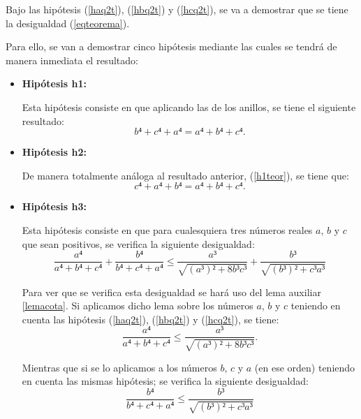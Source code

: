 \begin{demostracion}
  Bajo las hipótesis (\ref{haq2t}), (\ref{hbq2t}) y (\ref{hcq2t}), se va a
  demostrar que se tiene la desigualdad (\ref{eqteorema}).

  Para ello, se van a demostrar cinco hipótesis mediante las cuales se
  tendrá de manera inmediata el resultado:
  \begin{itemize}
  \item \textbf{Hipótesis h1:}

    Esta hipótesis consiste en que aplicando las de los anillos, se
    tiene el siguiente resultado:
    \begin{equation}\label{h1teor}\tag{h1}
      b⁴+c⁴+a⁴ = a⁴+b⁴+c⁴.
    \end{equation}

  \item \textbf{Hipótesis h2:}

    De manera totalmente análoga al resultado anterior, (\ref{h1teor}), se
    tiene que:
    \begin{equation}\label{h2teor}\tag{h2}
      c⁴+a⁴+b⁴ = a⁴+b⁴+c⁴.
    \end{equation}

  \item \textbf{Hipótesis h3:}

    Esta hipótesis consiste en que para cualesquiera tres números reales
    \(a\), \(b\) y \(c\) que sean positivos, se verifica la siguiente
    desigualdad:
    \begin{equation}\label{h3teor}\tag{h3}
      \frac{a⁴}{a⁴+b⁴+c⁴}+\frac{b⁴}{b⁴+c⁴+a⁴} ≤
      \frac{a³}{\sqrt{(a³)²+8b³c³}}+\frac{b³}{\sqrt{(b³)²+c³a³}}
    \end{equation}

    Para ver que se verifica esta desigualdad se hará uso del lema auxiliar
    \ref{lemacota}. Si aplicamos dicho lema sobre los números \(a\), \(b\)
    y \(c\) teniendo en cuenta las hipótesis (\ref{haq2t}), (\ref{hbq2t})
    y (\ref{hcq2t}), se tiene:
    \begin{equation}\label{h3teor1}
      \frac{a⁴}{a⁴+b⁴+c⁴} ≤ \frac{a³}{\sqrt{(a³)²+8b³c³}}.
    \end{equation}

    Mientras que si se lo aplicamos a los números \(b\), \(c\) y \(a\) (en
    ese orden) teniendo en cuenta las mismas hipótesis; se verifica la
    siguiente desigualdad:
    \begin{equation}\label{h3teor2}
      \frac{b⁴}{b⁴+c⁴+a⁴} ≤ \frac{b³}{\sqrt{(b³)²+c³a³}}
    \end{equation}


\end{itemize}
\end{demostracion}
